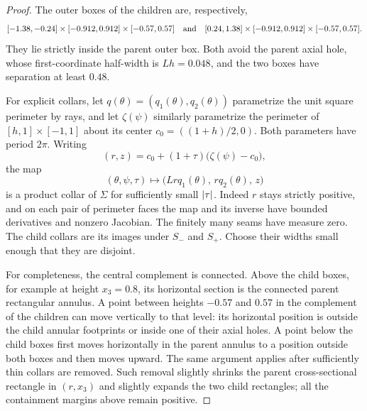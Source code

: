 \begin{proof}
The outer boxes of the children are, respectively,
\[
 [-1.38,-0.24]\times[-0.912,0.912]\times[-0.57,0.57]
 \quad\hbox{and}\quad
 [0.24,1.38]\times[-0.912,0.912]\times[-0.57,0.57].
\]
They lie strictly inside the parent outer box. Both avoid the parent
axial hole, whose first-coordinate half-width is \(Lh=0.048\), and
the two boxes have separation at least \(0.48\).

For explicit collars, let \(q(\theta)=(q_1(\theta),q_2(\theta))\)
parametrize the unit square perimeter by rays, and let
\(\zeta(\psi)\) similarly parametrize the perimeter of
\([h,1]\times[-1,1]\) about its center
\(c_0=((1+h)/2,0)\). Both parameters have period \(2\pi\).
Writing
\[
 (r,z)=c_0+(1+\tau)\bigl(\zeta(\psi)-c_0\bigr),
\]
the map
\begin{equation}\label{nu:collar}
 (\theta,\psi,\tau)\longmapsto
 \bigl(Lr q_1(\theta),\,r q_2(\theta),\,z\bigr)
\end{equation}
is a product collar of \(\Sigma\) for sufficiently small
\(\left\lvert \tau\right\rvert\). Indeed \(r\) stays strictly positive, and on
each pair of perimeter faces the map and its inverse have bounded
derivatives and nonzero Jacobian. The finitely many seams have measure
zero. The child collars are its images under \(S_-\) and \(S_+\).
Choose their widths small enough that they are disjoint.

For completeness, the central complement is connected. Above the child
boxes, for example at height \(x_3=0.8\), its horizontal section is the
connected parent rectangular annulus. A point between heights
\(-0.57\) and \(0.57\) in the complement of the children can move
vertically to that level: its horizontal position is outside the
child annular footprints or inside one of their axial holes. A point
below the child boxes first moves horizontally in the parent annulus
to a position outside both boxes and then moves upward. The same
argument applies after sufficiently thin collars are removed. Such
removal slightly shrinks the parent cross-sectional rectangle in
\((r,x_3)\) and slightly expands the two child rectangles; all the
containment margins above remain positive.


\end{proof}
